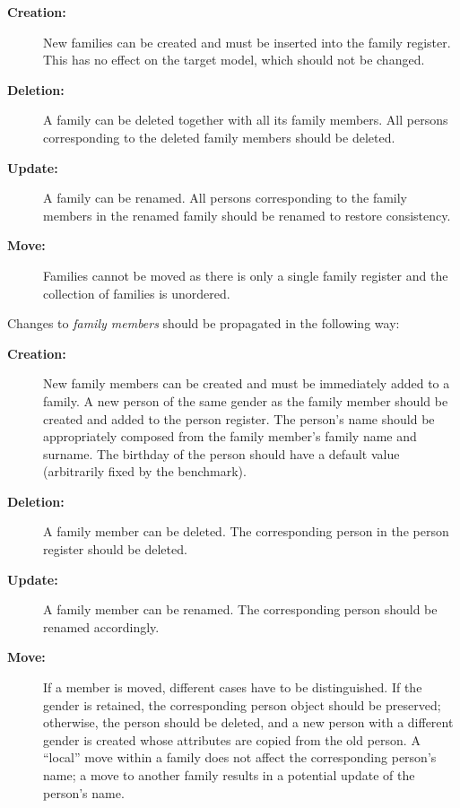 \begin{description}
    \item[\textbf{Creation:}]
    New families can be created and must be inserted into the family register.
    This has no effect on the target model, which should not be changed.
    
    \item[\textbf{Deletion:}]
    A family can be deleted together with all its family members.
    All persons corresponding to the deleted family members should be deleted.
    
    \item[\textbf{Update:}]
    A family can be renamed.  All persons corresponding to the family members in the renamed family should be renamed to restore consistency.
    
    \item[\textbf{Move:}]
    Families cannot be moved as there is only a single family register and the collection of families is unordered.
\end{description}


Changes to \emph{family members} should be propagated in the following way: 

\begin{description}
    \item[\textbf{Creation:}]
    New family members can be created and must be immediately added to a family.
    A new person of the same gender as the family member should be created and added to the person register.
    The person's name should be appropriately composed from the family member's family name and surname.
    The birthday of the person should have a default value (arbitrarily fixed by the benchmark). 
    
    \item[\textbf{Deletion:}]
    A family member can be deleted.  The corresponding person in the person register should be deleted.
    
    \item[\textbf{Update:}]
    A family member can be renamed.  The corresponding person should be renamed accordingly.
    
    \item[\textbf{Move:}]
    If a member is moved, different cases have to be distinguished.
    If the gender is retained, the corresponding person object should be preserved; otherwise, the person should be deleted, and a new person with a different gender is created whose attributes are copied from the old person. 
    A ``local'' move within a family does not affect the corresponding person's name; a move to another family results in a potential update of the person's name.
\end{description}


